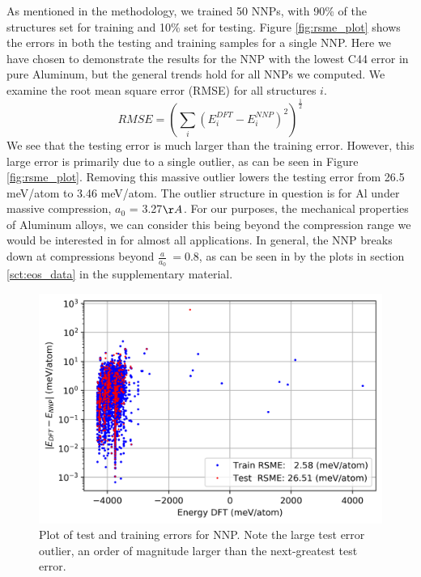 \documentclass{article}
\begin{document}
As mentioned in the methodology, we trained 50 NNPs, with 90\% of the structures set for training and 10\% set for testing.
Figure \ref{fig:rsme_plot} shows the errors in both the testing and training samples for a single NNP.
Here we have chosen to demonstrate the results for the NNP with the lowest C44 error in pure Aluminum, but the general trends hold for all NNPs we computed. We examine the root mean square error (RMSE) for all structures $i$.
\begin{equation}
    RMSE = (\sum_i (E^{DFT}_i - E^{NNP}_i)^2)^\frac{1}{2}
\end{equation}
We see that the testing error is much larger than the training error.
However, this large error is primarily due to a single outlier, as can be seen in  Figure \ref{fig:rsme_plot}.
Removing this massive outlier lowers the testing error from 26.5 meV/atom to 3.46 meV/atom.
The outlier structure in question is for Al under massive compression, $a_0$ = 3.27$\AA$.
For our purposes, the mechanical properties of Aluminum alloys, we can consider this being beyond the compression range we would be interested in for almost all applications.
In general, the NNP breaks down at compressions beyond $\frac{a}{a_0} ~= 0.8$, as can be seen in by the plots in section \ref{sct:eos_data} in the supplementary material. 

\begin{figure}[H]%
\centering%
\includegraphics[width=1.0\textwidth,center]{figures/plot_nnperrors.png}%
\caption{Plot of test and training errors for NNP.
Note the large test error outlier, an order of magnitude larger than the next-greatest test error. }%
\label{fst error ig:rsme_plot}
\end{figure}
\end{document}
